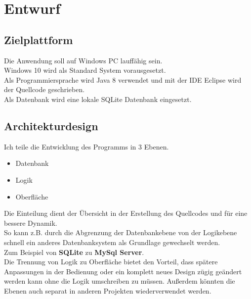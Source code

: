 \section{Entwurf}
\subsection{Zielplattform}
Die Anwendung soll auf Windows PC lauffähig sein.\\
Windows 10 wird als Standard System vorausgesetzt.\\
Als Programmiersprache wird Java 8 verwendet und mit der IDE Eclipse wird der Quellcode geschrieben.\\
Als Datenbank wird eine lokale SQLite Datenbank eingesetzt.\\

\subsection{Architekturdesign}
Ich teile die Entwicklung des Programms in 3 Ebenen.\\
\begin{itemize}
\item{Datenbank}
\item{Logik}
\item{Oberfläche}
\end{itemize}
Die Einteilung dient der Übersicht in der Erstellung des Quellcodes und für eine bessere Dynamik.\\
So kann z.B. durch die Abgrenzung der Datenbankebene von der Logikebene schnell ein anderes Datenbanksystem als Grundlage gewechselt werden. \\
Zum Beispiel von \textbf{SQLite} zu \textbf{MySql Server}.\\
Die Trennung von Logik zu Oberfläche bietet den Vorteil, dass spätere Anpassungen in der Bedienung oder ein komplett neues Design zügig geändert werden kann ohne die Logik umschreiben zu müssen. Außerdem könnten die Ebenen auch separat in anderen Projekten wiederverwendet werden.\\



